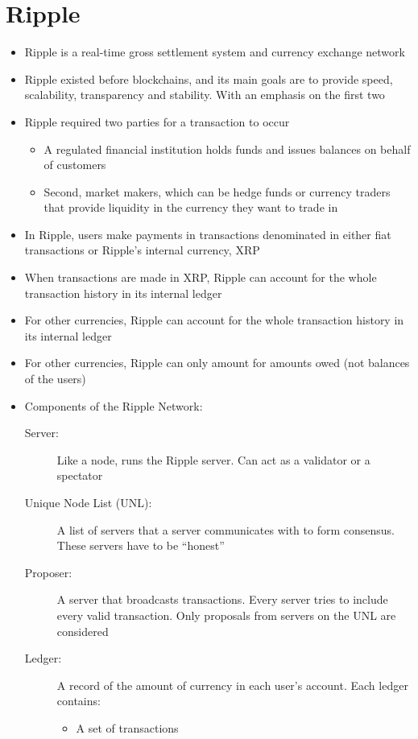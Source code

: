 \section{Ripple}
\begin{itemize}
	\item Ripple is a real-time gross settlement system and currency exchange network
	\item Ripple existed before blockchains, and its main goals are to provide speed, scalability, transparency and stability. With an emphasis on the first two
	\item Ripple required two parties for a transaction to occur
	\begin{itemize}
		\item A regulated financial institution holds funds and issues balances on behalf of customers
		\item Second, market makers, which can be hedge funds or currency traders that provide liquidity in the currency they want to trade in
	\end{itemize}
	\item In Ripple, users make payments in transactions denominated in either fiat transactions or Ripple's internal currency, XRP
	\item When transactions are made in XRP, Ripple can account for the whole transaction history in its internal ledger
	\item For other currencies, Ripple can account for the whole transaction history in its internal ledger
	\item For other currencies, Ripple can only amount for amounts owed (not balances of the users)
	\item Components of the Ripple Network:
	\begin{description}
		\item[Server:] Like a node, runs the Ripple server. Can act as a validator or a spectator
		\item[Unique Node List (UNL):] A list of servers that a server communicates with to form consensus. These servers have to be ``honest''
		\item[Proposer:] A server that broadcasts transactions. Every server tries to include every valid transaction. Only proposals from servers on the UNL are considered
		\item[Ledger:] A record of the amount of currency in each user's account. Each ledger contains:
		\begin{itemize}
			\item A set of transactions

\end{itemize}
\end{description}
\end{itemize}
